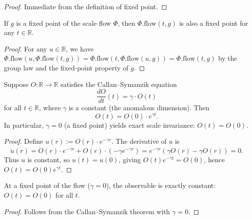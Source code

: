 \begin{proof}
Immediate from the definition of fixed point.
\end{proof}

\begin{theorem}
If $g$ is a fixed point of the scale flow $\Phi$, then $\Phi.\text{flow}(t, g)$ is also a fixed point for any $t \in \mathbb{R}$.
\end{theorem}

\begin{proof}
For any $u \in \mathbb{R}$, we have $\Phi.\text{flow}(u, \Phi.\text{flow}(t, g)) = \Phi.\text{flow}(t, \Phi.\text{flow}(u, g)) = \Phi.\text{flow}(t, g)$ by the group law and the fixed-point property of $g$.
\end{proof}

\begin{theorem}
Suppose $O : \mathbb{R} \to \mathbb{R}$ satisfies the Callan--Symanzik equation
\begin{equation}
\frac{dO}{dt}(t) = \gamma \cdot O(t)
\end{equation}
for all $t \in \mathbb{R}$, where $\gamma$ is a constant (the anomalous dimension). Then
\begin{equation}
O(t) = O(0) \cdot e^{\gamma t} .
\end{equation}
In particular, $\gamma = 0$ (a fixed point) yields exact scale invariance: $O(t) = O(0)$. 
\end{theorem}

\begin{proof}
Define $u(r) := O(r) \cdot e^{-\gamma r}$. The derivative of $u$ is
\begin{equation}
\dot{u}(r) = \dot{O}(r) \cdot e^{-\gamma r} + O(r) \cdot (-\gamma e^{-\gamma r})
  = e^{-\gamma r} (\gamma O(r) - \gamma O(r)) = 0 .
\end{equation}
Thus $u$ is constant, so $u(t) = u(0)$, giving $O(t) e^{-\gamma t} = O(0)$, hence $O(t) = O(0) e^{\gamma t}$.
\end{proof}

\begin{theorem}
At a fixed point of the flow ($\gamma = 0$), the observable is exactly constant: $O(t) = O(0)$ for all $t$.
\end{theorem}

\begin{proof}
Follows from the Callan--Symanzik theorem with $\gamma = 0$.
\end{proof}

